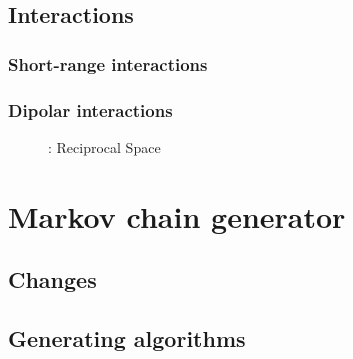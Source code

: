 \documentclass[a4paper, 12pt]{article}
\def\buildMode{buildmissing}
\begin{document}
        \subsection{Interactions}

            \subsubsection{Short-range interactions}
            \begin{figure}[htb]
                \centering
                
                \caption{}
            \end{figure}
            \clearpage

            \subsubsection{Dipolar interactions}
            \begin{figure}[htb]
                \centering
                
                \caption{}
            \end{figure}
            \begin{figure}[htb]
                \centering
                
                \caption{: Reciprocal Space}
            \end{figure}
            \clearpage

    \section{Markov chain generator}

        \subsection{Changes}
        \begin{figure}[htb]
            \centering
            
            \caption{}
        \end{figure}
        \clearpage

        \subsection{Generating algorithms}
        \begin{figure}[htb]
            \centering
            
            \caption{}
        \end{figure}
        \clearpage
\end{document}

